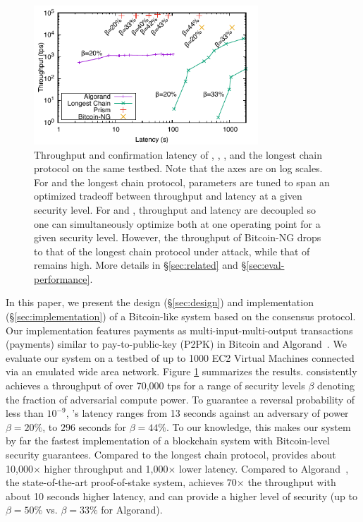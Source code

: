 \begin{figure} 
    \centering
    \includegraphics[width=0.75\textwidth]{figures/compare-fig.pdf}
    \caption{\small Throughput and confirmation latency of \prism, \algorand, \bng, and the longest chain protocol on the same testbed. Note that the axes are on log scales. For \algorand and the longest chain protocol, parameters are tuned to span an optimized tradeoff between throughput and latency at a given security level. For \bng and \prism, throughput and latency are decoupled so one can simultaneously optimize both at one operating point for a given security level. However, the throughput of Bitcoin-NG drops to that of the longest chain protocol under attack, while that of \prism remains high. More details in \S\ref{sec:related} and \S\ref{sec:eval-performance}. }
    \label{fig:compare}
\end{figure}


In this paper, we present the design (\S\ref{sec:design}) and  implementation (\S\ref{sec:implementation}) of a Bitcoin-like system based on the \prism consensus protocol. Our implementation features payments as multi-input-multi-output transactions (payments) similar to pay-to-public-key (P2PK) in Bitcoin and Algorand~\cite{algorand, algorandcode}. We evaluate our system on a testbed of up to 1000 EC2 Virtual Machines connected via an emulated wide area network. Figure \ref{fig:compare} summarizes the results. \prism consistently achieves a throughput of over 70,000 tps for a range of security levels $\beta$ denoting the fraction of adversarial compute power.  To guarantee a reversal probability of less than $10^{-9}$, \prism's latency ranges from 13 seconds against an adversary of power $\beta = 20\%$, to $296$ seconds for $\beta = 44\%$. To our knowledge, this makes our system by far the fastest  implementation of a blockchain system with Bitcoin-level security guarantees. Compared to the longest chain protocol, \prism provides about 10,000$\times$ higher throughput and 1,000$\times$ lower latency. Compared to Algorand~\cite{algorand}, the state-of-the-art proof-of-stake system, \prism achieves 70$\times$ the throughput with about 10 seconds higher latency, and can provide a higher level of security  (up to $\beta = 50\%$ vs. $\beta=33\%$ for Algorand).

